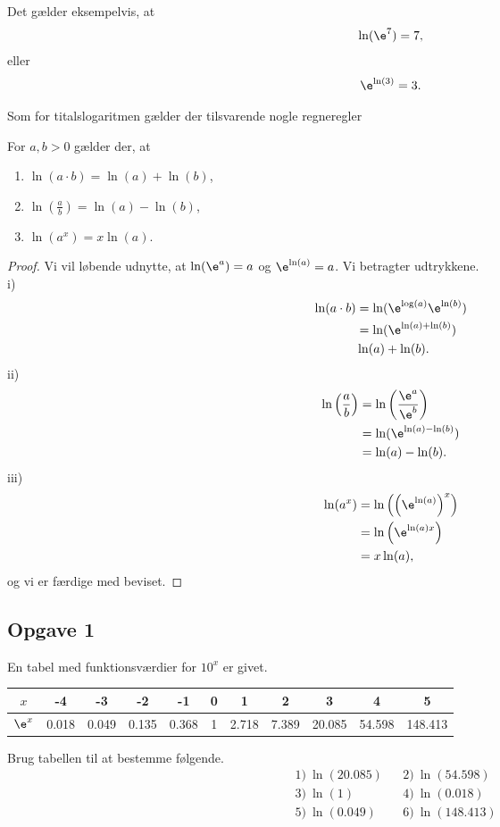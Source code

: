 \begin{exa}
	Det gælder eksempelvis, at 
	\begin{align*}
		\ln(\e^{7}) = 7,
	\end{align*}
	eller 
	\begin{align*}
		\e^{\ln(3)} = 3.
	\end{align*}
\end{exa}
Som for titalslogaritmen gælder der tilsvarende nogle regneregler
\begin{setn}[Logaritmeregneregler]
	For $a,b>0$ gælder der, at
	\begin{enumerate}[label=\roman*)]
		\item $\ln(a\cdot b) = \ln(a)+ \ln(b)$,
		\item $\ln\left(\frac{a}{b}\right) = \ln(a)-\ln(b)$,
		\item $\ln(a^x) = x\ln(a).$
	\end{enumerate}		
\end{setn}
\begin{proof}
	Vi vil løbende udnytte, at $\ln(\e^a) = a$ og $\e^{\ln(a)} = a$. Vi betragter udtrykkene.
	\\
	i)
	\begin{align*}
		\ln(a\cdot b) &= \ln(\e^{\log(a)}\e^{\ln(b)}) \\
		&= \ln(\e^{\ln(a)+\ln(b)})\\
		&\ln(a) + \ln(b).
	\end{align*}
	ii)
	\begin{align*}
		\ln\left(\frac{a}{b}\right) &= \ln\left(\frac{\e^a}{\e^b}\right)\\
		&= \ln(\e^{\ln(a)-\ln(b)})\\
		&= \ln(a)-\ln(b).
	\end{align*}
	iii)
	\begin{align*}
		\ln(a^x) &= \ln\left( \left(\e^{\ln(a)}\right)^x\right)\\
		&= \ln\left(\e^{\ln(a)x}\right)\\
		&= x\ln(a),
    \end{align*}		
    og vi er færdige med beviset. 
\end{proof}


\subsection*{Opgave 1}
En tabel med funktionsværdier for $10^x$ er givet.
\begin{table}[H]
	\centering
	\begin{tabular}{c|c|c|c|c|c|c|c|c|c|c}
		$x$ & -4 & -3 & -2 & -1 & 0 & 1 & 2 & 3 & 4 & 5 \\
		\hline
		$\e^x$ & 0.018 & 0.049 & 0.135& 0.368 & 1 & 2.718 & 7.389 & 20.085 & 54.598 & 148.413
	\end{tabular}
\end{table}
Brug tabellen til at bestemme følgende.
\begin{align*}
	&1) \ \ln(20.085)     &&2) \ \ln(54.598)    \\
	&3) \ \ln(1)     &&4) \  \ln(0.018)		\\
	&5) \ \ln(0.049) &&6) \ \ln(148.413)    
\end{align*}


